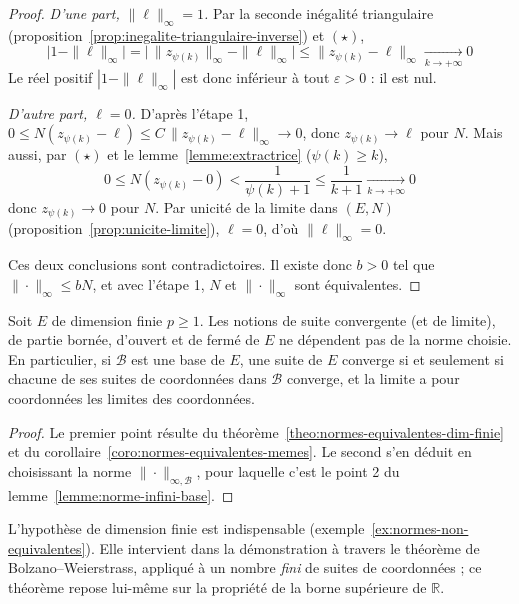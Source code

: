 \begin{proof}
\emph{D'une part, $\|\ell\|_\infty=1$.} Par la seconde inégalité triangulaire (proposition~\ref{prop:inegalite-triangulaire-inverse}) et $(\star)$,
\[\big|1-\|\ell\|_\infty\big| = \big|\,\|z_{\psi(k)}\|_\infty-\|\ell\|_\infty\big| \leq \|z_{\psi(k)}-\ell\|_\infty\xrightarrow[k\to+\infty]{}0\]
Le réel positif $|1-\|\ell\|_\infty|$ est donc inférieur à tout $\varepsilon>0$ : il est nul.

\emph{D'autre part, $\ell=0$.} D'après l'étape 1, $0\leq N(z_{\psi(k)}-\ell)\leq C\,\|z_{\psi(k)}-\ell\|_\infty\to 0$, donc $z_{\psi(k)}\to\ell$ pour $N$. Mais aussi, par $(\star)$ et le lemme~\ref{lemme:extractrice} ($\psi(k)\geq k$),
\[0\leq N(z_{\psi(k)}-0)<\frac{1}{\psi(k)+1}\leq\frac{1}{k+1}\xrightarrow[k\to+\infty]{}0\]
donc $z_{\psi(k)}\to 0$ pour $N$. Par unicité de la limite dans $(E,N)$ (proposition~\ref{prop:unicite-limite}), $\ell=0$, d'où $\|\ell\|_\infty=0$.

Ces deux conclusions sont contradictoires. Il existe donc $b>0$ tel que $\|\cdot\|_\infty\leq bN$, et avec l'étape 1, $N$ et $\|\cdot\|_\infty$ sont équivalentes.
\end{proof}

\begin{coro}
\label{coro:dim-finie-topologie}
Soit $E$ de dimension finie $p\geq 1$. Les notions de suite convergente (et de limite), de partie bornée, d'ouvert et de fermé de $E$ ne dépendent pas de la norme choisie. En particulier, si $\mathcal{B}$ est une base de $E$, une suite de $E$ converge si et seulement si chacune de ses suites de coordonnées dans $\mathcal{B}$ converge, et la limite a pour coordonnées les limites des coordonnées.
\end{coro}

\begin{proof}
Le premier point résulte du théorème~\ref{theo:normes-equivalentes-dim-finie} et du corollaire~\ref{coro:normes-equivalentes-memes}. Le second s'en déduit en choisissant la norme $\|\cdot\|_{\infty,\mathcal{B}}$, pour laquelle c'est le point 2 du lemme~\ref{lemme:norme-infini-base}.
\end{proof}

\begin{remarque}
L'hypothèse de dimension finie est indispensable (exemple~\ref{ex:normes-non-equivalentes}). Elle intervient dans la démonstration à travers le théorème de Bolzano--Weierstrass, appliqué à un nombre \emph{fini} de suites de coordonnées ; ce théorème repose lui-même sur la propriété de la borne supérieure de $\mathbb{R}$.
\end{remarque}
